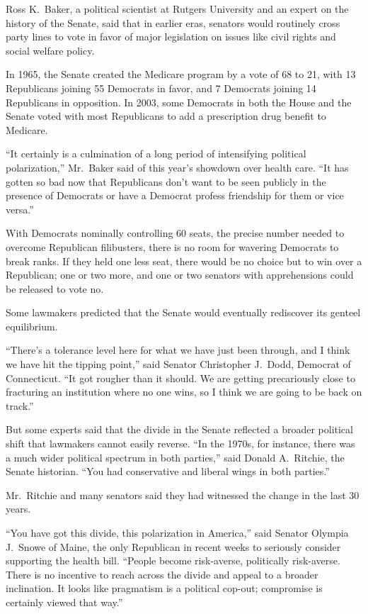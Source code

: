 ﻿\documentclass[12pt]{article}
\begin{document}
Ross K.~Baker, a political scientist at Rutgers University and an expert on the history of the
Senate, said that in earlier eras, senators would routinely cross party lines to vote in favor of
major legislation on issues like civil rights and social welfare policy.

In 1965, the Senate created the Medicare program by a vote of 68 to 21, with 13 Republicans joining
55 Democrats in favor, and 7 Democrats joining 14 Republicans in opposition. In 2003, some Democrats
in both the House and the Senate voted with most Republicans to add a prescription drug benefit to
Medicare.

``It certainly is a culmination of a long period of intensifying political polarization,'' Mr.~Baker
said of this year's showdown over health care. ``It has gotten so bad now that Republicans don't
want to be seen publicly in the presence of Democrats or have a Democrat profess friendship for them
or vice versa.''

With Democrats nominally controlling 60 seats, the precise number needed to overcome Republican
filibusters, there is no room for wavering Democrats to break ranks. If they held one less seat,
there would be no choice but to win over a Republican; one or two more, and one or two senators with
apprehensions could be released to vote no.

Some lawmakers predicted that the Senate would eventually rediscover its genteel equilibrium.

``There's a tolerance level here for what we have just been through, and I think we have hit the
tipping point,'' said Senator Christopher J.~Dodd, Democrat of Connecticut. ``It got rougher than it
should. We are getting precariously close to fracturing an institution where no one wins, so I think
we are going to be back on track.''

But some experts said that the divide in the Senate reflected a broader political shift that
lawmakers cannot easily reverse. ``In the 1970s, for instance, there was a much wider political
spectrum in both parties,'' said Donald A.~Ritchie, the Senate historian. ``You had conservative and
liberal wings in both parties.''

Mr.~Ritchie and many senators said they had witnessed the change in the last 30 years.

``You have got this divide, this polarization in America,'' said Senator Olympia J.~Snowe of Maine,
the only Republican in recent weeks to seriously consider supporting the health bill. ``People
become risk-averse, politically risk-averse. There is no incentive to reach across the divide and
appeal to a broader inclination. It looks like pragmatism is a political cop-out; compromise is
certainly viewed that way.''
\end{document}
